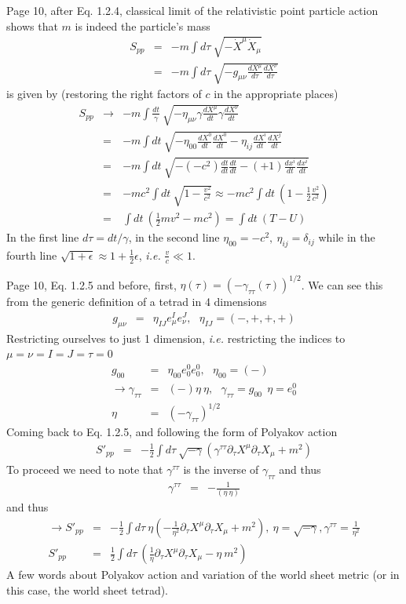 \documentclass[aps,preprint,preprintnumbers,nofootinbib,showpacs,prd]{revtex4-1}
\newcommand{\ie}{{\it i.e.} }
\newcommand{\nbea}{\begin{eqnarray*}}
\newcommand{\neea}{\end{eqnarray*}}
\begin{document}
Page 10, after Eq. 1.2.4, classical limit of the relativistic point particle action shows that $m$ is indeed the particle's mass
%
\nbea
S_{pp} & = & -m \int d\tau~ \sqrt{-\dot X^\mu \dot X_\mu} \\
& = & -m \int d\tau~ \sqrt{-g_{\mu\nu} \frac{d X^\mu}{d\tau} \frac{dX^\nu}{d\tau}} 
\neea
%
is given by (restoring the right factors of $c$ in the appropriate places)
%
\nbea
S_{pp} & \rightarrow & -m \int \frac{dt}{\gamma}~ \sqrt{-\eta_{\mu\nu} \gamma \frac{d X^\mu}{dt} \gamma \frac{dX^\nu}{dt}} \\
& = & -m \int dt~ \sqrt{-\eta_{00} \frac{d X^0}{dt} \frac{dX^0}{dt} -\eta_{ij} \frac{d X^i}{dt} \frac{dX^j}{dt} } \\
& = & -m \int dt~ \sqrt{-(-c^2) \frac{dt}{dt} \frac{dt}{dt} -(+1) \frac{d x^i}{dt} \frac{dx^i}{dt} } \\
& = & -m c^2 \int dt~ \sqrt{1 - \frac{v^2}{c^2}} \approx -m c^2 \int dt~ \left ( 1 - \frac{1}{2} \frac{v^2}{c^2} \right ) \\
& = & \int dt~\left ( \frac{1}{2} m v^2 - m c^2 \right ) = \int dt ~ \left ( T - U \right )
\neea
%
In the first line $d\tau = dt /\gamma$, in the second line $\eta_{00} = -c^2,~ \eta_{ij} = \delta_{ij}$ while in the fourth line $\sqrt{1 + \epsilon} \approx 1 + \frac{1}{2} \epsilon$, \ie $\frac{v}{c} \ll 1$.

Page 10, Eq. 1.2.5 and before, first, $\eta(\tau) = (-\gamma_{\tau\tau}(\tau))^{1/2}$. We can see this from the generic definition of a tetrad in 4 dimensions
%
\nbea
g_{\mu\nu} & = & \eta_{IJ} e^I_\mu e^J_\nu, ~~~\eta_{IJ} = (-,+,+,+)
\neea
%
Restricting ourselves to just 1 dimension, \ie restricting the indices to $\mu=\nu=I=J=\tau=0$
%
\nbea
g_{00} & = & \eta_{00} e^0_0 e^0_0, ~~~\eta_{00} = (-) \\
\rightarrow \gamma_{\tau\tau} & = & (-) \eta ~ \eta, ~~~ \gamma_{\tau\tau} = g_{00} ~~ \eta = e^0_0\\
\eta & = & (-\gamma_{\tau\tau})^{1/2}
\neea
%
Coming back to Eq. 1.2.5, and following the form of Polyakov action
%
\nbea
S'_{pp} & = & -\frac{1}{2} \int d\tau ~ \sqrt{-\gamma} \left ( \gamma^{\tau\tau} \partial_\tau X^\mu \partial_\tau X_\mu + m^2 \right )
\neea
%
To proceed we need to note that $\gamma^{\tau\tau}$ is the inverse of $\gamma_{\tau\tau}$ and thus
%
\nbea
\gamma^{\tau\tau} & = & - \frac{1} { (\eta ~ \eta) }
\neea
%
and thus
%
\nbea
\rightarrow S'_{pp} & = & -\frac{1}{2} \int d\tau ~ \eta \left ( - \frac{1} { \eta^2 } \partial_\tau X^\mu \partial_\tau X_\mu + m^2 \right ), ~ \eta = \sqrt{-\gamma}, \gamma^{\tau\tau} = \frac{1} { \eta^2 }\\
S'_{pp} & = & \frac{1}{2} \int d\tau ~\left ( \frac{1} { \eta } \partial_\tau X^\mu \partial_\tau X_\mu - \eta~ m^2 \right )
\neea
%
A few words about Polyakov action and variation of the world sheet metric (or in this case, the world sheet tetrad).
\end{document}
